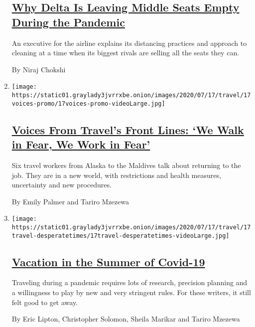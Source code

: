 \begin{enumerate}
  \hypertarget{why-delta-is-leaving-middle-seats-empty-during-the-pandemic}{%
  \subsection{\texorpdfstring{\href{/2020/07/27/business/delta-airlines-bill-lentsch.html}{Why
  Delta Is Leaving Middle Seats Empty During the
  Pandemic}}{Why Delta Is Leaving Middle Seats Empty During the Pandemic}}\label{why-delta-is-leaving-middle-seats-empty-during-the-pandemic}}

  An executive for the airline explains its distancing practices and
  approach to cleaning at a time when its biggest rivals are selling all
  the seats they can.

  By Niraj Chokshi
\item
  \texttt{[image: https://static01.graylady3jvrrxbe.onion/images/2020/07/17/travel/17voices-promo/17voices-promo-videoLarge.jpg]}

  \hypertarget{voices-from-travels-front-lines-we-walk-in-fear-we-work-in-fear}{%
  \subsection{\texorpdfstring{\href{/2020/07/17/travel/coronavirus-travel-hospitality-workers.html}{Voices
  From Travel's Front Lines: `We Walk in Fear, We Work in
  Fear'}}{Voices From Travel's Front Lines: `We Walk in Fear, We Work in Fear'}}\label{voices-from-travels-front-lines-we-walk-in-fear-we-work-in-fear}}

  Six travel workers from Alaska to the Maldives talk about returning to
  the job. They are in a new world, with restrictions and health
  measures, uncertainty and new procedures.

  By Emily Palmer and Tariro Mzezewa
\item
  \texttt{[image: https://static01.graylady3jvrrxbe.onion/images/2020/07/17/travel/17travel-desperatetimes/17travel-desperatetimes-videoLarge.jpg]}

  \hypertarget{vacation-in-the-summer-of-covid-19}{%
  \subsection{\texorpdfstring{\href{/2020/07/16/travel/virus-vacation.html}{Vacation
  in the Summer of
  Covid-19}}{Vacation in the Summer of Covid-19}}\label{vacation-in-the-summer-of-covid-19}}

  Traveling during a pandemic requires lots of research, precision
  planning and a willingness to play by new and very stringent rules.
  For these writers, it still felt good to get away.

  By Eric Lipton, Christopher Solomon, Sheila Marikar and Tariro Mzezewa
\end{enumerate}

